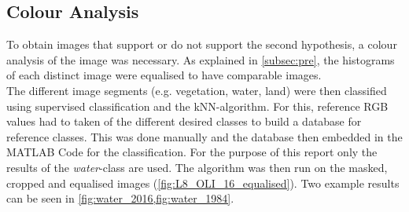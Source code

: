\begin{figure}[h!]
\centering
\begin{minipage}{.5\textwidth}
	\centering
	\label{fig:morphclose}
\end{minipage}%
\begin{minipage}{.5\textwidth}
	\centering
	\label{fig:morpherode}
\end{minipage}
\end{figure}

\subsection{Colour Analysis}
To obtain images that support or do not support the second hypothesis, a colour analysis of the image was necessary. As explained in \cref{subsec:pre}, the histograms of each distinct image were equalised to have comparable images.\\
The different image segments (e.g. vegetation, water, land) were then classified using supervised classification and the kNN-algorithm. For this, reference RGB values had to taken of the different desired classes to build a database for reference classes. This was done manually and the database then embedded in the MATLAB Code for the classification. For the purpose of this report only the results of the \textit{water}-class are used.
The algorithm was then run on the masked, cropped and equalised images (\cref{fig:L8_OLI_16_equalised}). Two example results can be seen in \cref{fig:water_2016,fig:water_1984}.

